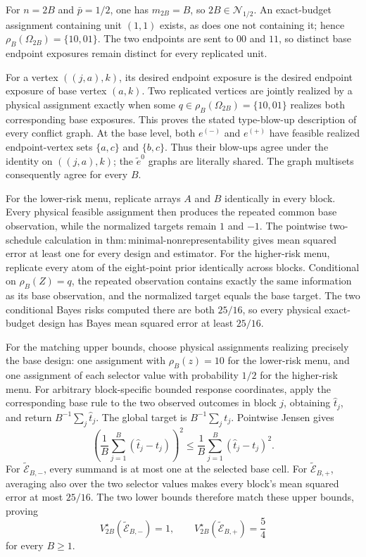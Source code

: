 For \(n=2B\) and \(\bar p=1/2\), one has \(m_{2B}=B\), so \(2B\in\mathcal N_{1/2}\).  An exact-budget assignment containing unit \((1,1)\) exists, as does one not containing it; hence \(\rho_B(\Omega_{2B})=\{10,01\}\).  The two endpoints are sent to \(00\) and \(11\), so distinct base endpoint exposures remain distinct for every replicated unit.

For a vertex \(((j,a),k)\), its desired endpoint exposure is the desired endpoint exposure of base vertex \((a,k)\).  Two replicated vertices are jointly realized by a physical assignment exactly when some \(q\in\rho_B(\Omega_{2B})=\{10,01\}\) realizes both corresponding base exposures.  This proves the stated type-blow-up description of every conflict graph.  At the base level, both \(e^{(-)}\) and \(e^{(+)}\) have feasible realized endpoint-vertex sets \(\{a,c\}\) and \(\{b,c\}\).  Thus their blow-ups agree under the identity on \(((j,a),k)\); the \(\widetilde e^0\) graphs are literally shared.  The graph multisets consequently agree for every \(B\).

For the lower-risk menu, replicate arrays \(A\) and \(B\) identically in every block.  Every physical feasible assignment then produces the repeated common base observation, while the normalized targets remain \(1\) and \(-1\).  The pointwise two-schedule calculation in \(\mathrm{thm{:}minimal\text{-}nonrepresentability}\) gives mean squared error at least one for every design and estimator.  For the higher-risk menu, replicate every atom of the eight-point prior identically across blocks.  Conditional on \(\rho_B(Z)=q\), the repeated observation contains exactly the same information as its base observation, and the normalized target equals the base target.  The two conditional Bayes risks computed there are both \(25/16\), so every physical exact-budget design has Bayes mean squared error at least \(25/16\).

For the matching upper bounds, choose physical assignments realizing precisely the base design: one assignment with \(\rho_B(z)=10\) for the lower-risk menu, and one assignment of each selector value with probability \(1/2\) for the higher-risk menu.  For arbitrary block-specific bounded response coordinates, apply the corresponding base rule to the two observed outcomes in block \(j\), obtaining \(\widehat t_j\), and return \(B^{-1}\sum_j\widehat t_j\).  The global target is \(B^{-1}\sum_jt_j\).  Pointwise Jensen gives
\[
 \left(\frac1B\sum_{j=1}^B(\widehat t_j-t_j)\right)^2
 \le\frac1B\sum_{j=1}^B(\widehat t_j-t_j)^2.
\]
For \(\widetilde{\mathcal E}_{B,-}\), every summand is at most one at the selected base cell.  For \(\widetilde{\mathcal E}_{B,+}\), averaging also over the two selector values makes every block's mean squared error at most \(25/16\).  The two lower bounds therefore match these upper bounds, proving
\[
 V_{2B}^\star(\widetilde{\mathcal E}_{B,-})=1,
 \qquad
 V_{2B}^\star(\widetilde{\mathcal E}_{B,+})=\frac54
\]
for every \(B\ge1\).